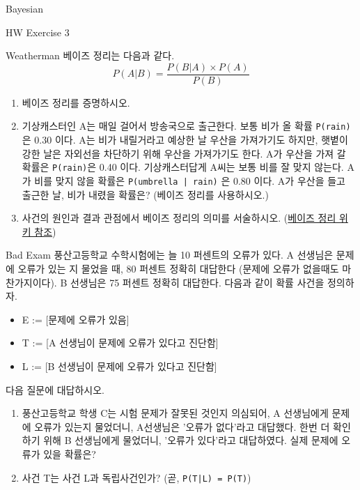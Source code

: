 \begin{edXchapter}{Bayesian}

\begin{edXsection}{HW Exercise 3}

\begin{edXvertical}

\begin{edXproblem}{Weatherman}
베이즈 정리는 다음과 같다.
\begin{equation}
P(A|B) = \frac{P(B|A) \times P(A)}{P(B)} 
\end{equation}
\begin{enumerate}
\item 베이즈 정리를 증명하시오.

\item 기상캐스터인 A는  매일 걸어서 방송국으로 출근한다. 보통 비가 올 확률 {\tt\LARGE P(rain)} 은  0.30 이다.
A는 비가 내릴거라고 예상한 날 우산을 가져가기도 하지만, 햇볕이 강한 날은 자외선을 차단하기 
위해 우산을 가져가기도 한다. A가 우산을 가져 갈 확률은 {\tt\LARGE P(rain)}은 0.40 이다. 
기상캐스터답게 A씨는 보통 비를 잘 맞지 않는다. A가 비를 맞지 않을 확률은 {\tt\LARGE P(umbrella | rain)} 은 0.80 이다.
A가 우산을 들고 출근한 날, 비가 내렸을 확률은? (베이즈 정리를 사용하시오.)
\item 사건의 원인과 결과 관점에서 베이즈 정리의 의미를 서술하시오.
(\href{http://ko.wikipedia.org/wiki/베이즈_정리}{베이즈 정리 위키 참조})
\end{enumerate}
\end{edXproblem}

\begin{edXproblem}{Bad Exam}
풍산고등학교 수학시험에는 늘 10 퍼센트의 오류가 있다. A 선생님은 문제에 오류가 있는 지 물었을 때,
80 퍼센트 정확히 대답한다 (문제에 오류가 없을때도 마찬가지이다). B 선생님은 75 퍼센트 정확히 대답한다.
다음과 같이 확률 사건을 정의하자.
\begin{itemize}
\item E := [문제에 오류가 있음]
\item T := [A 선생님이 문제에 오류가 있다고 진단함]
\item L := [B 선생님이 문제에 오류가 있다고 진단함]
\end{itemize}

다음 질문에 대답하시오.
\begin{enumerate} 
\item 풍산고등학교 학생 C는 시험 문제가 잘못된 것인지 의심되어, 
A 선생님에게 문제에 오류가 있는지 물었더니, A선생님은 '오류가 없다'라고 대답했다.
한번 더 확인하기 위해 B 선생님에게 물었더니, '오류가 있다'라고 대답하였다.
실제 문제에 오류가 있을 확률은?
\item 사건 T는 사건 L과 독립사건인가? (곧, {\tt\LARGE P(T|L) = P(T)})
\end{enumerate}
\end{edXproblem}


\end{edXvertical}
\end{edXsection}
\end{edXchapter}
